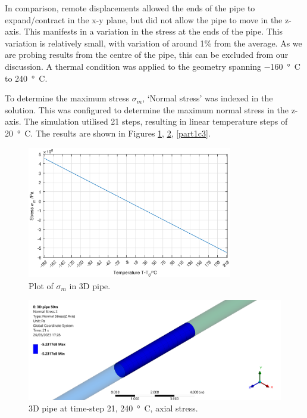In comparison, remote displacements allowed the ends of the pipe to expand/contract in the x-y plane, but did not allow the pipe to move in the z-axis. This manifests in a variation in the stress at the ends of the pipe. This variation is relatively small, with variation of around 1\% from the average. As we are probing results from the centre of the pipe, this can be excluded from our discussion. A thermal condition was applied to the geometry spanning \SI{-160}{\degree C} to \SI{240}{\degree C}.

To determine the maximum stress $\sigma_m$, `Normal stress' was indexed in the solution. This was configured to determine the maximum normal stress in the z-axis. The simulation utilised 21 steps, resulting in linear temperature steps of \SI{20}{\degree C}. The results are shown in Figures \ref{part1cSimResults}, \ref{part1c2}, \ref{part1c3}.
\begin{figure}[H]
    \centering
    \includegraphics[width = 0.8\textwidth]{img/part1ci.eps}
    \caption{Plot of $\sigma_m$ in 3D pipe.}
    \label{part1cSimResults}
\end{figure}
\begin{figure}[H]
    \centering
    \includegraphics[width=\textwidth]{img/part1c-1.png}
    \caption{3D pipe at time-step 21, \SI{240}{\degree C}, axial stress.}
    \label{part1c2}
\end{figure}%
